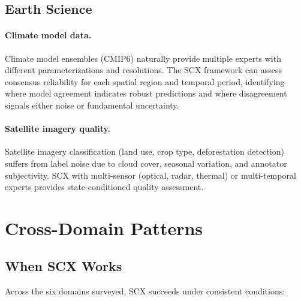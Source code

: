 \documentclass[twocolumn]{article}
\theoremstyle{definition}
\begin{document}
\subsection{Earth Science}

\paragraph{Climate model data.}
Climate model ensembles (CMIP6) naturally provide multiple experts with different parameterizations and resolutions. The SCX framework can assess consensus reliability for each spatial region and temporal period, identifying where model agreement indicates robust predictions and where disagreement signals either noise or fundamental uncertainty.

\paragraph{Satellite imagery quality.}
Satellite imagery classification (land use, crop type, deforestation detection) suffers from label noise due to cloud cover, seasonal variation, and annotator subjectivity. SCX with multi-sensor (optical, radar, thermal) or multi-temporal experts provides state-conditioned quality assessment.

\section{Cross-Domain Patterns}
\label{sec:tradeoff}

\subsection{When SCX Works}

Across the six domains surveyed, SCX succeeds under consistent conditions:
\end{document}
